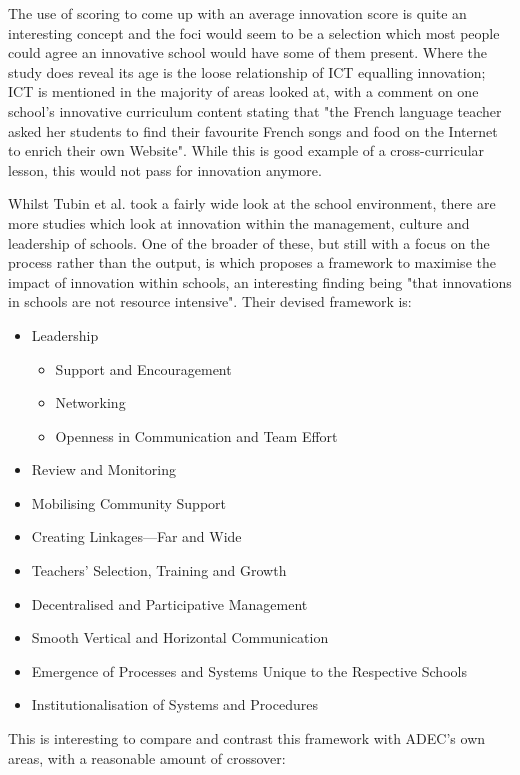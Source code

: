 The use of scoring to come up with an average innovation score is quite an interesting concept and the foci would seem to be a selection which most people could agree an innovative school would have some of them present. Where the study does reveal its age is the loose relationship of ICT equalling innovation; ICT is mentioned in the majority of areas looked at, with a comment on one school's innovative curriculum content stating that "the French language teacher asked her students to find their favourite French songs and food on the Internet to enrich their own Website". While this is good example of a cross-curricular lesson, this would not pass for innovation anymore.

Whilst Tubin et al. took a fairly wide look at the school environment, there are more studies which look at innovation within the management, culture and leadership of schools. One of the broader of these, but still with a focus on the process rather than the output, is \citet{Sharma_2005} which proposes a framework to maximise the impact of innovation within schools, an interesting finding being "that innovations in schools are not resource intensive". Their devised framework is:

\begin{itemize}
\item Leadership
    \begin{itemize}
    \item Support and Encouragement
    \item Networking
    \item Openness in Communication and Team Effort
    \end{itemize}
\item Review and Monitoring
\item Mobilising Community Support
\item Creating Linkages—Far and Wide
\item Teachers’ Selection, Training and Growth
\item Decentralised and Participative Management
\item Smooth Vertical and Horizontal Communication
\item Emergence of Processes and Systems Unique to the Respective Schools
\item Institutionalisation of Systems and Procedures
\end{itemize}

This is interesting to compare and contrast this framework with ADEC's own areas, with a reasonable amount of crossover:


